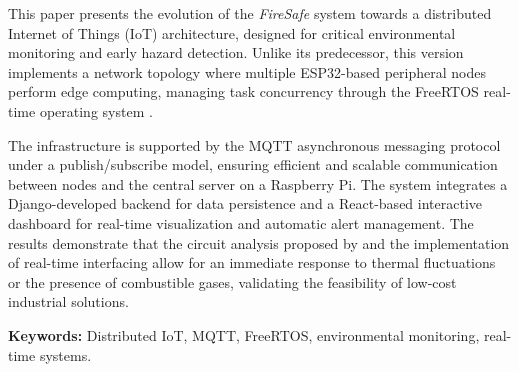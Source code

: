 This paper presents the evolution of the \textit{FireSafe} system towards a distributed Internet of Things (IoT) architecture, designed for critical environmental monitoring and early hazard detection. Unlike its predecessor, this version implements a network topology where multiple ESP32-based peripheral nodes perform edge computing, managing task concurrency through the FreeRTOS real-time operating system \citep{valvano2014volume1}. 

The infrastructure is supported by the MQTT asynchronous messaging protocol under a publish/subscribe model, ensuring efficient and scalable communication between nodes and the central server on a Raspberry Pi. The system integrates a Django-developed backend for data persistence and a React-based interactive dashboard for real-time visualization and automatic alert management. The results demonstrate that the circuit analysis proposed by \citet{boylestad2009} and the implementation of real-time interfacing \citep{valvano2014volume2} allow for an immediate response to thermal fluctuations or the presence of combustible gases, validating the feasibility of low-cost industrial solutions.

\textbf{Keywords:} Distributed IoT, MQTT, FreeRTOS, environmental monitoring, real-time systems.
